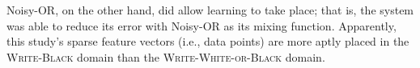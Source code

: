 Noisy-OR, on the other hand, did allow learning to take place; that is, 
the system was able to reduce its error with Noisy-OR as its mixing function. 
Apparently, this study's sparse feature vectors (i.e., data points) are more aptly 
placed in the \textsc{Write-Black} domain than the \textsc{Write-White-or-Black} domain.



